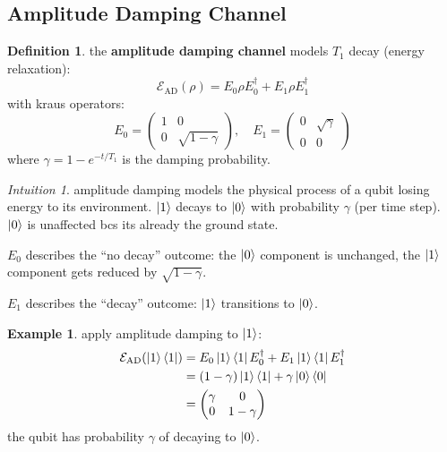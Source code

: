 \documentclass[11pt,a4paper]{article}
\theoremstyle{definition}
\newtheorem{definition}{Definition}[section]
\newtheorem{example}{Example}[section]
\theoremstyle{remark}
\newtheorem*{intuition}{Intuition}
\begin{document}
\subsection{Amplitude Damping Channel}

\begin{definition}
the \textbf{amplitude damping channel} models $T_1$ decay (energy relaxation):
\[
\mathcal{E}_{\text{AD}}(\rho) = E_0 \rho E_0^\dagger + E_1 \rho E_1^\dagger
\]
with kraus operators:
\[
E_0 = \begin{pmatrix} 1 & 0 \\ 0 & \sqrt{1-\gamma} \end{pmatrix}, \quad E_1 = \begin{pmatrix} 0 & \sqrt{\gamma} \\ 0 & 0 \end{pmatrix}
\]
where $\gamma = 1 - e^{-t/T_1}$ is the damping probability.
\end{definition}

\begin{intuition}
amplitude damping models the physical process of a qubit losing energy to its environment. $\ket{1}$ decays to $\ket{0}$ with probability $\gamma$ (per time step). $\ket{0}$ is unaffected bcs its already the ground state.

$E_0$ describes the ``no decay'' outcome: the $\ket{0}$ component is unchanged, the $\ket{1}$ component gets reduced by $\sqrt{1-\gamma}$.

$E_1$ describes the ``decay'' outcome: $\ket{1}$ transitions to $\ket{0}$.
\end{intuition}

\begin{example}
apply amplitude damping to $\ket{1}$:
\begin{align}
\mathcal{E}_{\text{AD}}(\ket{1}\bra{1}) &= E_0\ket{1}\bra{1}E_0^\dagger + E_1\ket{1}\bra{1}E_1^\dagger \\
&= (1-\gamma)\ket{1}\bra{1} + \gamma\ket{0}\bra{0} \\
&= \begin{pmatrix} \gamma & 0 \\ 0 & 1-\gamma \end{pmatrix}
\end{align}
the qubit has probability $\gamma$ of decaying to $\ket{0}$.
\end{example}
\end{document}
